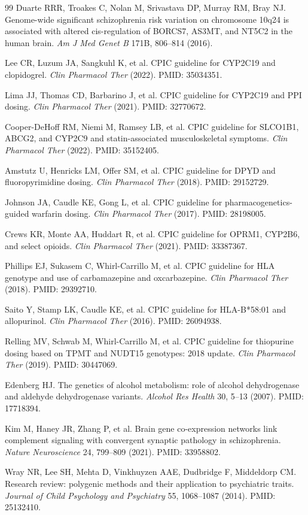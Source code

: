 \documentclass[11pt,a4paper]{article}
\begin{document}
\begin{thebibliography}{99}
 Duarte RRR, Troakes C, Nolan M, Srivastava DP, Murray RM, Bray NJ. Genome-wide significant schizophrenia risk variation on chromosome 10q24 is associated with altered cis-regulation of BORCS7, AS3MT, and NT5C2 in the human brain. \emph{Am J Med Genet B} 171B, 806--814 (2016).

 Lee CR, Luzum JA, Sangkuhl K, et al. CPIC guideline for CYP2C19 and clopidogrel. \emph{Clin Pharmacol Ther} (2022). PMID: 35034351.

 Lima JJ, Thomas CD, Barbarino J, et al. CPIC guideline for CYP2C19 and PPI dosing. \emph{Clin Pharmacol Ther} (2021). PMID: 32770672.

 Cooper-DeHoff RM, Niemi M, Ramsey LB, et al. CPIC guideline for SLCO1B1, ABCG2, and CYP2C9 and statin-associated musculoskeletal symptoms. \emph{Clin Pharmacol Ther} (2022). PMID: 35152405.

 Amstutz U, Henricks LM, Offer SM, et al. CPIC guideline for DPYD and fluoropyrimidine dosing. \emph{Clin Pharmacol Ther} (2018). PMID: 29152729.

 Johnson JA, Caudle KE, Gong L, et al. CPIC guideline for pharmacogenetics-guided warfarin dosing. \emph{Clin Pharmacol Ther} (2017). PMID: 28198005.

 Crews KR, Monte AA, Huddart R, et al. CPIC guideline for OPRM1, CYP2B6, and select opioids. \emph{Clin Pharmacol Ther} (2021). PMID: 33387367.

 Phillips EJ, Sukasem C, Whirl-Carrillo M, et al. CPIC guideline for HLA genotype and use of carbamazepine and oxcarbazepine. \emph{Clin Pharmacol Ther} (2018). PMID: 29392710.

 Saito Y, Stamp LK, Caudle KE, et al. CPIC guideline for HLA-B*58:01 and allopurinol. \emph{Clin Pharmacol Ther} (2016). PMID: 26094938.

 Relling MV, Schwab M, Whirl-Carrillo M, et al. CPIC guideline for thiopurine dosing based on TPMT and NUDT15 genotypes: 2018 update. \emph{Clin Pharmacol Ther} (2019). PMID: 30447069.

 Edenberg HJ. The genetics of alcohol metabolism: role of alcohol dehydrogenase and aldehyde dehydrogenase variants. \emph{Alcohol Res Health} 30, 5--13 (2007). PMID: 17718394.

 Kim M, Haney JR, Zhang P, et al. Brain gene co-expression networks link complement signaling with convergent synaptic pathology in schizophrenia. \emph{Nature Neuroscience} 24, 799--809 (2021). PMID: 33958802.

 Wray NR, Lee SH, Mehta D, Vinkhuyzen AAE, Dudbridge F, Middeldorp CM. Research review: polygenic methods and their application to psychiatric traits. \emph{Journal of Child Psychology and Psychiatry} 55, 1068--1087 (2014). PMID: 25132410.

\end{thebibliography}
\end{document}
